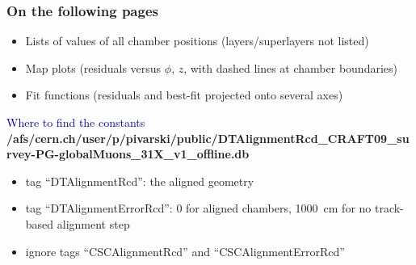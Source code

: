 \documentclass[compress]{beamer}
\begin{document}
\begin{frame}
\frametitle{On the following pages}
\begin{itemize}\setlength{\itemsep}{0.5 cm}
\item Lists of values of all chamber positions (layers/superlayers not listed)
\item Map plots (residuals versus $\phi$, $z$, with dashed lines at chamber boundaries)
\item Fit functions (residuals and best-fit projected onto several axes)
\end{itemize}

\vfill
\hspace{-0.83 cm} \textcolor{darkblue}{\Large Where to find the constants}
\vspace{0.2 cm}
{\tiny \bf /afs/cern.ch/user/p/pivarski/public/DTAlignmentRcd\_CRAFT09\_survey-PG-globalMuons\_31X\_v1\_offline.db}

\begin{itemize}
\item tag ``DTAlignmentRcd'': the aligned geometry
\item tag ``DTAlignmentErrorRcd'': 0 for aligned chambers, 1000~cm for no track-based alignment step
\item ignore tags ``CSCAlignmentRcd'' and ``CSCAlignmentErrorRcd''
\end{itemize}

\label{numpages}
\end{frame}
\end{document}
